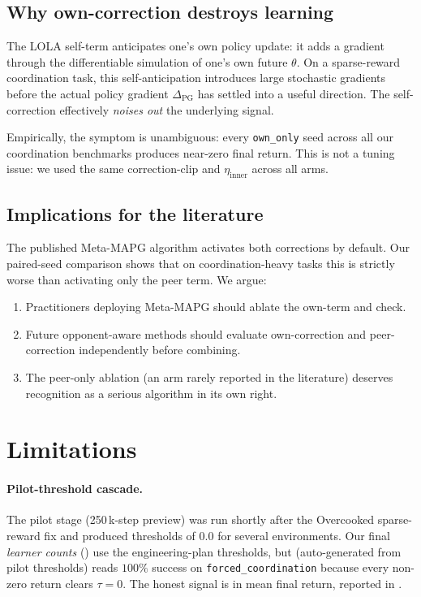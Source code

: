 \documentclass[11pt,a4paper]{article}
\newcommand{\arm}[1]{\texttt{#1}}
\newcommand{\thr}{\tau}
\begin{document}
\subsection{Why own-correction destroys learning}

The LOLA self-term anticipates one's own policy update: it adds a gradient through the differentiable simulation of one's own future $\theta$.
On a sparse-reward coordination task, this self-anticipation introduces large stochastic gradients before the actual policy gradient $\Delta_{\text{PG}}$ has settled into a useful direction.
The self-correction effectively \emph{noises out} the underlying signal.

Empirically, the symptom is unambiguous: every \arm{own\_only} seed across all our coordination benchmarks produces near-zero final return.
This is not a tuning issue: we used the same correction-clip and $\eta_{\text{inner}}$ across all arms.

\subsection{Implications for the literature}

The published Meta-MAPG algorithm activates both corrections by default.
Our paired-seed comparison shows that on coordination-heavy tasks this is strictly worse than activating only the peer term.
We argue:

\begin{enumerate}
    \item Practitioners deploying Meta-MAPG should ablate the own-term and check.
    \item Future opponent-aware methods should evaluate own-correction and peer-correction independently before combining.
    \item The peer-only ablation (an arm rarely reported in the literature) deserves recognition as a serious algorithm in its own right.
\end{enumerate}

\section{Limitations}\label{sec:limitations}

\paragraph{Pilot-threshold cascade.}
The pilot stage (250\,k-step preview) was run shortly after the Overcooked sparse-reward fix and produced thresholds of $0.0$ for several environments.
Our final \emph{learner counts} () use the engineering-plan thresholds, but  (auto-generated from pilot thresholds) reads $100\%$ success on \texttt{forced\_coordination} because every non-zero return clears $\thr = 0$.
The honest signal is in mean final return, reported in .
\end{document}
